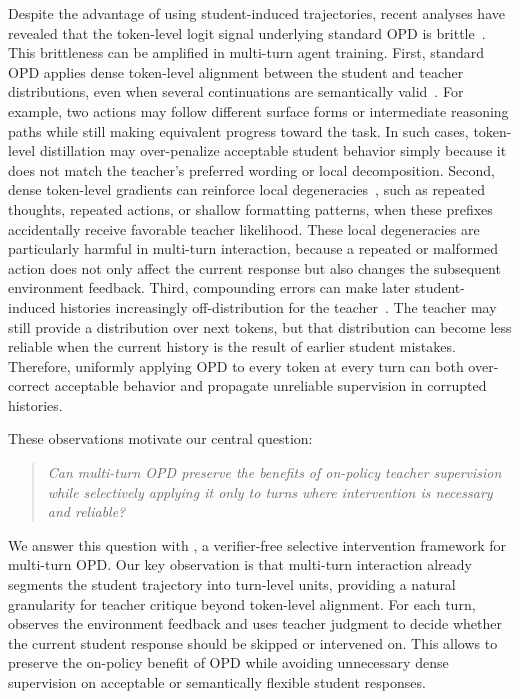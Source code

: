 Despite the advantage of using student-induced trajectories, recent analyses have revealed that the token-level logit signal underlying standard OPD is brittle~\citep{li2026rethinking, luo2026demystifying}.
%
This brittleness can be amplified in multi-turn agent training.
%
First, standard OPD applies dense token-level alignment between the student and teacher distributions, even when several continuations are semantically valid~\citep{li2026rethinking}.
%
For example, two actions may follow different surface forms or intermediate reasoning paths while still making equivalent progress toward the task.
%
In such cases, token-level distillation may over-penalize acceptable student behavior simply because it does not match the teacher's preferred wording or local decomposition.
%
Second, dense token-level gradients can reinforce local degeneracies~\citep{luo2026demystifying}, such as repeated thoughts, repeated actions, or shallow formatting patterns, when these prefixes accidentally receive favorable teacher likelihood.
%
These local degeneracies are particularly harmful in multi-turn interaction, because a repeated or malformed action does not only affect the current response but also changes the subsequent environment feedback.
%
Third, compounding errors can make later student-induced histories increasingly off-distribution for the teacher~\citep{li2025beyond}.
%
The teacher may still provide a distribution over next tokens, but that distribution can become less reliable when the current history is the result of earlier student mistakes.
%
Therefore, uniformly applying OPD to every token at every turn can both over-correct acceptable behavior and propagate unreliable supervision in corrupted histories.
%

These observations motivate our central question:
%
\begin{quote}
    \centering
    \textit{Can multi-turn OPD preserve the benefits of on-policy teacher supervision while selectively applying it only to turns where intervention is necessary and reliable?}
\end{quote}
%

We answer this question with \textbf{\ours{}}, a verifier-free selective intervention framework for multi-turn OPD.
%
Our key observation is that multi-turn interaction already segments the student trajectory into turn-level units, providing a natural granularity for teacher critique beyond token-level alignment.
%
For each turn, \ours{} observes the environment feedback and uses teacher judgment to decide whether the current student response should be skipped or intervened on.
%
This allows \ours{} to preserve the on-policy benefit of OPD while avoiding unnecessary dense supervision on acceptable or semantically flexible student responses.

